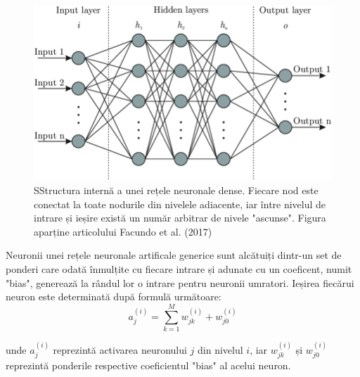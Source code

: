 \documentclass[a4paper,12pt]{book}
\begin{document}
			\begin{figure}[t]
			\centering
			\includegraphics[scale=0.50]{nns}
			\caption{SStructura internă a unei rețele neuronale dense. Fiecare nod este conectat la toate nodurile din nivelele adiacente, iar între nivelul de intrare și ieșire există un număr arbitrar de nivele "ascunse". Figura aparține articolului Facundo et al. (2017) \cite{nnspic}}
			\label{fig:nns}
			\end{figure}	
			
			Neuronii unei rețele neuronale artificale generice sunt alcătuiți dintr-un set de ponderi care odată înmulțite cu fiecare intrare și adunate cu un coeficent, numit "bias", generează la rândul lor o intrare pentru neuronii umratori. 
			\noindent Ieșirea fiecărui neuron este determinată după formulă următoare:
			\begin{equation}
					a_j^{(i)} = \sum_{k=1}^{M} w_{jk}^{(i)} + w_{j0}^{(i)}
			\end{equation}
			
			unde $a_j^{(i)}$ reprezintă activarea neuronului $j$ din nivelul $i$, iar $w_{jk}^{(i)}$ și $w_{j0}^{(i)}$ reprezintă ponderile respective coeficientul "bias" al acelui neuron. \par
			
\end{document}
